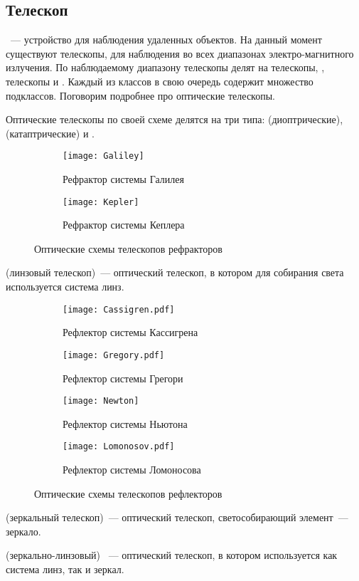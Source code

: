 \subsection{Телескоп}
~--- устройство для наблюдения удаленных объектов. На данный момент существуют телескопы, для наблюдения во всех  диапазонах электро-магнитного излучения. По наблюдаемому диапазону телескопы делят на  телескопы, , телескопы и . Каждый из классов в свою очередь содержит множество подклассов. Поговорим подробнее про оптические телескопы.

Оптические телескопы по своей схеме делятся на три типа:  (диоптрические),  (катаптрические) и .

\vspace{-.3pc}
\begin{figure}[h!]
	\centering
	\begin{subfigure}{0.49\tw}
		\texttt{[image: Galiley]}
		\caption{Рефрактор системы Галилея}
	 \end{subfigure}
	 \hfill
	\begin{subfigure}{0.49\tw}
		\texttt{[image: Kepler]}
		\caption{Рефрактор системы Кеплера}
		 \label{Kepler}
	 \end{subfigure}
	 \caption{Оптические схемы телескопов рефракторов}
\end{figure}
 (линзовый телескоп)~---  оптический телескоп, в котором для собирания света используется система линз.

\vspace{-.3pc}
\begin{figure}[h!]
	 \begin{subfigure}{0.49\tw}
		\texttt{[image: Cassigren.pdf]}
		\caption{Рефлектор системы Кассигрена}
	 \end{subfigure}
	 \hfill
	 \begin{subfigure}{0.49\tw}
		\texttt{[image: Gregory.pdf]}
		\caption{Рефлектор системы Грегори}
		\label{Gregory}
	 \end{subfigure}
	 \vskip4pt
	\begin{subfigure}{0.49\tw}
		\texttt{[image: Newton]}
 		\caption{Рефлектор системы Ньютона}
	\end{subfigure}
	\hfill
	\begin{subfigure}{0.49\tw}
		\texttt{[image: Lomonosov.pdf]}
		\caption{Рефлектор системы Ломоносова}
	\end{subfigure}
	\caption{Оптические схемы телескопов рефлекторов}
\end{figure}
 (зеркальный телескоп)~---  оптический телескоп, светособирающий элемент~--- зеркало.

 (зеркально-линзовый) ~--- оптический телескоп, в котором используется как система линз, так и зеркал.